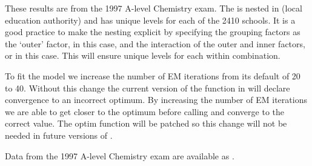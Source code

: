 \documentclass[12pt]{article}
\begin{document}
These results are from the 1997 A-level Chemistry exam.  The
 is nested in  (local education authority) and
has unique levels for each of the 2410 schools.  It is a good practice
to make the nesting explicit by specifying the grouping factors as the
`outer' factor,  in this case, and the interaction of the
outer and inner factors,  or  in
this case.  This will ensure unique levels for each 
within  combination.

To fit the model  we increase the number of EM iterations
from its default of 20 to 40.  Without this change the current version
of the  function in \RR{} will declare convergence to an
incorrect optimum.  By increasing the number of EM iterations we are
able to get closer to the optimum before calling  and
converge to the correct value.  The optim function will be patched so
this change will not be needed in future versions of \RR{}.

Data from the 1997 A-level Chemistry exam are available as .
\end{document}

